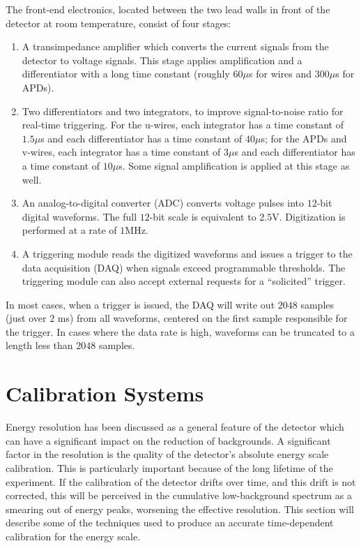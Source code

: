 The front-end electronics, located between the two lead walls in front of the detector at room temperature, consist of four stages:~\cite{detectorPartI,ReconstructionDocument}
\begin{enumerate}
\item A transimpedance amplifier which converts the current signals from the detector to voltage signals.  This stage applies amplification and a differentiator with a long time constant (roughly $60\mu$s for wires and $300\mu$s for APDs).
\item Two differentiators and two integrators, to improve signal-to-noise ratio for real-time triggering.  For the u-wires, each integrator has a time constant of $1.5\mu$s and each differentiator has a time constant of $40\mu$s; for the APDs and v-wires, each integrator has a time constant of $3\mu$s and each differentiator has a time constant of $10\mu$s.  Some signal amplification is applied at this stage as well.
\item An analog-to-digital converter (ADC) converts voltage pulses into $12$-bit digital waveforms.  The full $12$-bit scale is equivalent to $2.5$V.  Digitization is performed at a rate of $1$MHz.
\item A triggering module reads the digitized waveforms and issues a trigger to the data acquisition (DAQ) when signals exceed programmable thresholds.  The triggering module can also accept external requests for a ``solicited'' trigger.
\end{enumerate}
In most cases, when a trigger is issued, the DAQ will write out $2048$ samples (just over $2$ ms) from all waveforms, centered on the first sample responsible for the trigger.  In cases where the data rate is high, waveforms can be truncated to a length less than $2048$ samples.

\section{Calibration Systems}\label{sec:DetectorCalibration}

Energy resolution has been discussed as a general feature of the detector which can have a significant impact on the reduction of backgrounds.   A significant factor in the resolution is the quality of the detector's absolute energy scale calibration.  This is particularly important because of the long lifetime of the experiment.  If the calibration of the detector drifts over time, and this drift is not corrected, this will be perceived in the cumulative low-background spectrum as a smearing out of energy peaks, worsening the effective resolution.  This section will describe some of the techniques used to produce an accurate time-dependent calibration for the energy scale.

